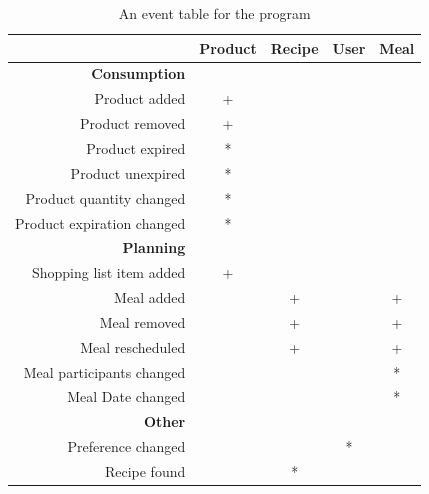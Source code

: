 \begin{table}[H]\centering
    \begin{tabular}{|r|c|c|c|c|}
        \hline
        ~                                      & Product & Recipe & User & Meal\\ \hline
        \textbf{Consumption}                   & ~       & ~      & ~    & ~   \\ 
		    Product added                          & +       & ~      & ~    & ~   \\ 
        Product removed                        & +       & ~      & ~    & ~   \\ 
        Product expired                        & *       & ~      & ~    & ~   \\ 
        Product unexpired                      & *       & ~      & ~    & ~   \\ 
        Product quantity changed               & *       & ~      & ~    & ~   \\ 
        Product expiration changed             & *       & ~      & ~    & ~   \\ 
        \textbf{Planning}                      & ~       & ~      & ~    & ~   \\ 
        Shopping list item added               & +       & ~      & ~    & ~   \\ 
        Meal added                             & ~       & +      & ~    & +   \\ 
        Meal removed                           & ~       & +      & ~    & +   \\ 
        Meal rescheduled                       & ~       & +      & ~    & +   \\ 
        Meal participants changed              & ~       & ~      & ~    & *   \\ 
        Meal Date changed                      & ~       & ~      & ~    & *   \\ 
        \textbf{Other}                         & ~       & ~      & ~    & ~   \\ 
        Preference changed                     & ~       & ~      & *    & ~   \\ 
		    Recipe found                           & ~       & *      & ~    & ~   \\ 
		\hline    
    \end{tabular}
    \caption{An event table for the program} 
    \label{tab:EventTable}
\end{table}